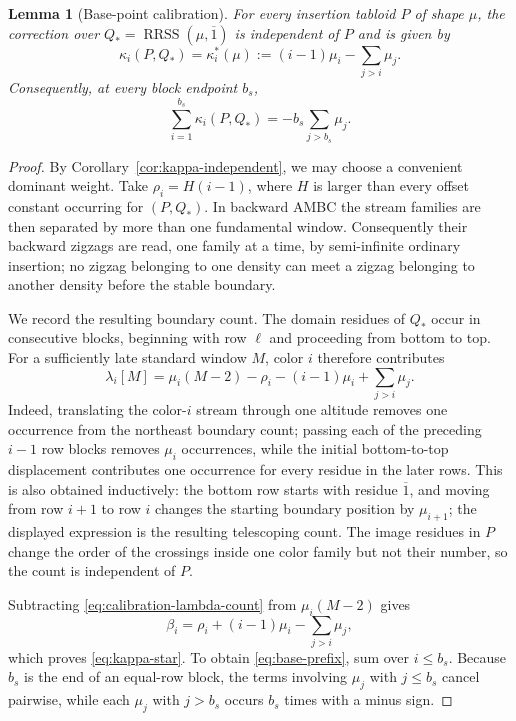 \documentclass[10pt,a4paper]{amsart}
\newtheorem{lemma}{Lemma}
\newcommand{\RRSS}{\operatorname{RRSS}}
\newcommand{\ol}[1]{\overline{#1}}
\begin{document}
\begin{lemma}[Base-point calibration]\label{lem:base-calibration}
For every insertion tabloid \(P\) of shape \(\mu\), the correction over
\(Q_*=\RRSS(\mu,\ol1)\) is independent of \(P\) and is given by
\begin{equation}\label{eq:kappa-star}
 \kappa_i(P,Q_*)=\kappa_i^*(\mu)
 :=(i-1)\mu_i-\sum_{j>i}\mu_j.
\end{equation}
Consequently, at every block endpoint \(b_s\),
\begin{equation}\label{eq:base-prefix}
 \sum_{i=1}^{b_s}\kappa_i(P,Q_*)=-b_s\sum_{j>b_s}\mu_j.
\end{equation}
\end{lemma}

\begin{proof}
By Corollary~\ref{cor:kappa-independent}, we may choose a convenient dominant weight.
Take \(\rho_i=H(i-1)\), where \(H\) is larger than every offset constant occurring for
\((P,Q_*)\).  In backward AMBC the stream families are then separated by more than one
fundamental window.  Consequently their backward zigzags are read, one family at a
time, by semi-infinite ordinary insertion; no zigzag belonging to one density can meet
a zigzag belonging to another density before the stable boundary.

We record the resulting boundary count.  The domain residues of \(Q_*\) occur in
consecutive blocks, beginning with row \(\ell\) and proceeding from bottom to top.
For a sufficiently late standard window \(M\), color \(i\) therefore contributes
\begin{equation}\label{eq:calibration-lambda-count}
 \lambda_i[M]
 =\mu_i(M-2)-\rho_i-(i-1)\mu_i+\sum_{j>i}\mu_j.
\end{equation}
Indeed, translating the color-\(i\) stream through one altitude removes one occurrence
from the northeast boundary count; passing each of the preceding \(i-1\) row blocks
removes \(\mu_i\) occurrences, while the initial bottom-to-top displacement contributes
one occurrence for every residue in the later rows.  This is also obtained inductively:
the bottom row starts with residue \(\ol1\), and moving from row \(i+1\) to row \(i\)
changes the starting boundary position by \(\mu_{i+1}\); the displayed expression is
the resulting telescoping count.  The image residues in \(P\) change the order of the
crossings inside one color family but not their number, so the count is independent of
\(P\).

Subtracting \eqref{eq:calibration-lambda-count} from \(\mu_i(M-2)\) gives
\[
 \beta_i=\rho_i+(i-1)\mu_i-\sum_{j>i}\mu_j,
\]
which proves \eqref{eq:kappa-star}.  To obtain \eqref{eq:base-prefix}, sum over
\(i\le b_s\).  Because \(b_s\) is the end of an equal-row block, the terms involving
\(\mu_j\) with \(j\le b_s\) cancel pairwise, while each \(\mu_j\) with \(j>b_s\)
occurs \(b_s\) times with a minus sign.
\end{proof}
\end{document}
